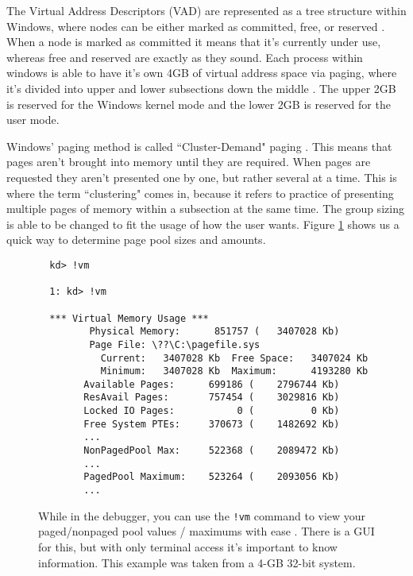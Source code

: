 \documentclass[10pt,draftclsnofoot,onecolumn]{IEEEtran}
\begin{document}
\par The Virtual Address Descriptors (VAD) are represented as a tree structure within Windows, where nodes can be either marked as committed, free, or reserved \cite{win:2}.
When a node is marked as committed it means that it's currently under use, whereas free and reserved are exactly as they sound.
Each process within windows is able to have it's own 4GB of virtual address space via paging, where it's divided into upper and lower subsections down the middle \cite{win:2}.
The upper 2GB is reserved for the Windows kernel mode and the lower 2GB is reserved for the user mode.

\par Windows' paging method is called ``Cluster-Demand" paging \cite{win:2}.
This means that pages aren't brought into memory until they are required.
When pages are requested they aren't presented one by one, but rather several at a time.
This is where the term ``clustering" comes in, because it refers to practice of presenting multiple pages of memory within a subsection at the same time.
The group sizing is able to be changed to fit the usage of how the user wants.
Figure \ref{code:determining_pool_sizes} shows us a quick way to determine page pool sizes and amounts.

\begin{figure}[h]
\begin{lstlisting}
  kd> !vm

  1: kd> !vm

  *** Virtual Memory Usage ***
         Physical Memory:      851757 (   3407028 Kb)
         Page File: \??\C:\pagefile.sys
           Current:   3407028 Kb  Free Space:   3407024 Kb
           Minimum:   3407028 Kb  Maximum:      4193280 Kb
        Available Pages:      699186 (    2796744 Kb)
        ResAvail Pages:       757454 (    3029816 Kb)
        Locked IO Pages:           0 (          0 Kb)
        Free System PTEs:     370673 (    1482692 Kb)
        ...
        NonPagedPool Max:     522368 (    2089472 Kb)
        ...
        PagedPool Maximum:    523264 (    2093056 Kb)
        ...
\end{lstlisting}
\centering
\captionsetup{justification=centering}
\caption{
  While in the debugger, you can use the \texttt{!vm} command to view your paged/nonpaged pool values / maximums with ease \cite{win:2}.
  There is a GUI for this, but with only terminal access it's important to know information.
  This example was taken from a 4-GB 32-bit system.
}
\label{code:determining_pool_sizes}
\end{figure}
\end{document}
